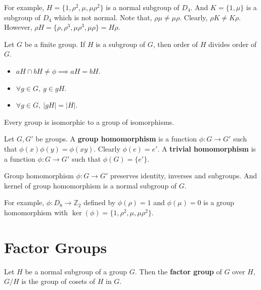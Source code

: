 \begin{remark}
	For example, $H = \{1,\rho^2,\mu,\mu\rho^2\}$ is a normal subgroup of $D_4$.
	And $K = \{1,\mu\}$ is a subgroup of $D_4$ which is not normal.
	Note that, $\rho\mu \ne \mu\rho$.
	Clearly, $\rho K \ne K\rho$.
	However, $\rho H = \{ \rho, \rho^3, \mu\rho^3, \mu\rho \} = H\rho$.
\end{remark}

\begin{remark}%
	Let $G$ be a finite group.
	If $H$ is a subgroup of $G$, then order of $H$ divides order of $G$.
\end{remark}
\begin{itemize}
	\item $aH \cap bH \ne \phi \implies aH = bH$.
	\item $\forall g \in G,\ g \in gH$.
	\item $\forall g \in G,\ |gH| = |H|$.
\end{itemize}

\begin{remark}%
	Every group is isomorphic to a group of isomorphisms.
\end{remark}

\begin{definition}
	Let $G,G'$ be groups.
	A \textbf{group homomorphism} is a function $\phi : G \to G'$ such that $\phi(x)\phi(y) = \phi(xy)$.
	Clearly $\phi(e) = e'$.
	A \textbf{trivial homomorphism} is a function $\phi : G \to G'$ such that $\phi(G) = \{ e' \}$.
\end{definition}


\begin{remark}
	Group homomorphism $\phi : G \to G'$ preserves identity, inverses and subgroups.
	And kernel of group homomorphism is a normal subgroup of $G$.%
\end{remark}
\begin{remark}
	For example, $\phi : D_8 \to \mathbb{Z}_2$ defined by $\phi(\rho) = 1$ and $\phi(\mu) = 0$ is a group homomorphism with $\ker(\phi) = \{ 1,\rho^2,\mu,\mu\rho^2 \}$.
\end{remark}

\section{Factor Groups}
\begin{remark}
	Let $H$ be a normal subgroup of a group $G$.
	Then the \textbf{factor group} of $G$ over $H$, $G/H$ is the group of cosets of $H$ in $G$.
\end{remark}

